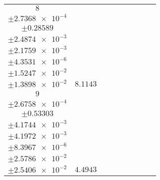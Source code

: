 \documentclass[8pt]{article}
\begin{document}
\begin{longtable}[l]{c c c c c c c c c}
$\num{8}$ & \begin{tabular}[c]{@{}c@{}}$\num{5.4819e-2}$ \\ $\pm\num{2.7368e-4}$\end{tabular} & \begin{tabular}[c]{@{}c@{}}$\num{0.13927}$ \\ $\pm\num{0.28589}$\end{tabular} & \begin{tabular}[c]{@{}c@{}}$\num{10.389}$ \\ $\pm\num{2.4874e-3}$\end{tabular} & \begin{tabular}[c]{@{}c@{}}$\num{2.0849e+3}$ \\ $\pm\num{2.1759e-3}$\end{tabular} & \begin{tabular}[c]{@{}c@{}}$\num{4.1709}$ \\ $\pm\num{4.3531e-6}$\end{tabular} & \begin{tabular}[c]{@{}c@{}}$\num{2.6345}$ \\ $\pm\num{1.5247e-2}$\end{tabular} & \begin{tabular}[c]{@{}c@{}}$\num{2.3188}$ \\ $\pm\num{1.3898e-2}$\end{tabular} & $\num{8.1143}$\\
$\num{9}$ & \begin{tabular}[c]{@{}c@{}}$\num{2.9549e-2}$ \\ $\pm\num{2.6758e-4}$\end{tabular} & \begin{tabular}[c]{@{}c@{}}$\num{0.48335}$ \\ $\pm\num{0.53303}$\end{tabular} & \begin{tabular}[c]{@{}c@{}}$\num{-7.5424}$ \\ $\pm\num{4.1744e-3}$\end{tabular} & \begin{tabular}[c]{@{}c@{}}$\num{2.1359e+3}$ \\ $\pm\num{4.1972e-3}$\end{tabular} & \begin{tabular}[c]{@{}c@{}}$\num{4.2729}$ \\ $\pm\num{8.3967e-6}$\end{tabular} & \begin{tabular}[c]{@{}c@{}}$\num{2.4348}$ \\ $\pm\num{2.5786e-2}$\end{tabular} & \begin{tabular}[c]{@{}c@{}}$\num{2.394}$ \\ $\pm\num{2.5406e-2}$\end{tabular} & $\num{4.4943}$\\

\end{longtable}
\end{document}
